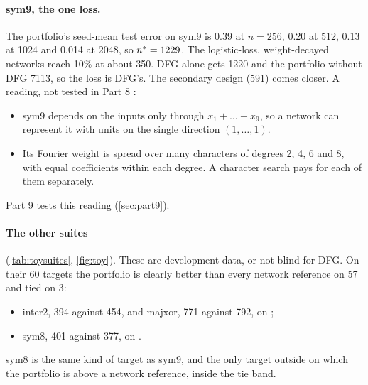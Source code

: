\paragraph{sym9, the one loss.} The portfolio's seed-mean test error on sym9 is 0.39 at $n=256$, 0.20 at 512, 0.13 at 1024 and 0.014 at 2048, so $n^{*}=1229$. The logistic-loss, weight-decayed networks reach 10\% at about 350. DFG alone gets 1220 and the portfolio without DFG 7113, so the loss is DFG's. The secondary design  (591) comes closer. A reading, not tested in Part 8 :
\begin{itemize}
\item sym9 depends on the inputs only through $x_1+\dots+x_9$, so a network can represent it with units on the single direction $(1,\dots,1)$.
\item Its Fourier weight is spread over many characters of degrees 2, 4, 6 and 8, with equal coefficients within each degree. A character search pays for each of them separately.
\end{itemize}
Part 9 tests this reading (\cref{sec:part9}).

\paragraph{The other suites} (\cref{tab:toysuites}, \cref{fig:toy}). These are development data, or not blind for DFG. On their 60 targets the portfolio is clearly better than every network reference on 57 and tied on 3:
\begin{itemize}
\item inter2, 394 against 454, and majxor, 771 against 792, on ;
\item sym8, 401 against 377, on .
\end{itemize}
sym8 is the same kind of target as sym9, and the only target outside  on which the portfolio is above a network reference, inside the tie band.


